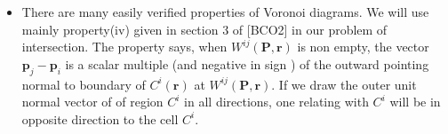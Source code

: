 \begin{itemize}
\item There are many easily verified properties of Voronoi diagrams. We will use mainly property(iv) given in section 3 of [BCO2] in our problem of intersection. The property says, when $W^{i j}(\mathbf{P},\mathbf{r})$ is non empty, the vector $\mathbf{p}_j - \mathbf{p}_i $ is a scalar multiple  (and negative in sign ) of the outward pointing normal to boundary of $C^i(\mathbf{r})$ at $W^{i j}(\mathbf{P}, \mathbf{r})$. If we draw  the outer unit normal vector of of region $C^{i}$ in all directions, one relating with  $C^{i}$ will be in opposite direction to the cell $C^{i}$.

\end{itemize}



